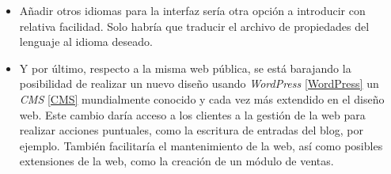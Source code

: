 \begin{itemize}
\item Añadir otros idiomas para la interfaz sería otra opción a introducir con relativa facilidad. Solo habría que traducir el archivo de propiedades del lenguaje al idioma deseado. 
\item Y por último, respecto a la misma web pública, se está barajando la posibilidad de realizar un nuevo diseño usando \textit{WordPress} \ref{WordPress} un \textit{CMS} \ref{CMS} mundialmente conocido y cada vez más extendido en el diseño web. Este cambio daría acceso a los clientes a la gestión de la web para realizar acciones puntuales, como la escritura de entradas del blog, por ejemplo. También facilitaría el mantenimiento de la web, así como posibles extensiones de la web, como la creación de un módulo de ventas. 
\end{itemize}


